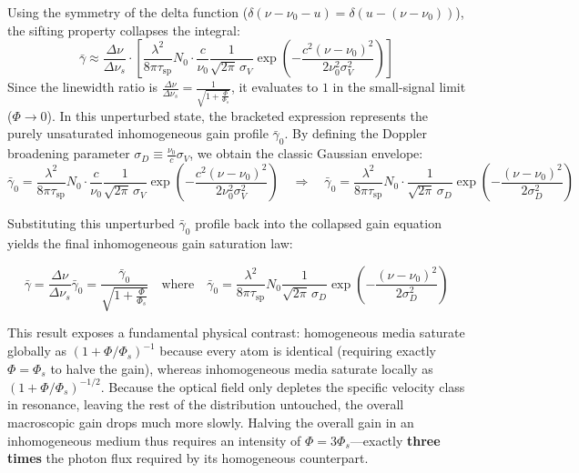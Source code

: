 Using the symmetry of the delta function ($\delta(\nu - \nu_0 - u) = \delta(u - (\nu - \nu_0))$), the sifting property collapses the integral:
\begin{equation*}
    \bar{\gamma} \approx \frac{\Delta\nu}{\Delta\nu_s} \cdot \left[ \frac{\lambda^2}{8\pi\tau_{\mathrm{sp}}} N_0 \cdot \frac{c}{\nu_0} \frac{1}{\sqrt{2\pi}\,\sigma_V} \exp\!\left(-\frac{c^2(\nu - \nu_0)^2}{2\nu_0^2\sigma_V^2}\right) \right]
\end{equation*}
Since the linewidth ratio is $\frac{\Delta\nu}{\Delta\nu_s} = \frac{1}{\sqrt{1 + \frac{\Phi}{\Phi_s}}}$, it evaluates to $1$ in the small-signal limit ($\Phi \to 0$). In this unperturbed state, the bracketed expression represents the purely unsaturated inhomogeneous gain profile $\bar{\gamma}_0$. By defining the Doppler broadening parameter $\sigma_D \equiv \frac{\nu_0}{c}\sigma_V$, we obtain the classic Gaussian envelope:
\begin{equation*}
    \bar{\gamma}_0 = \frac{\lambda^2}{8\pi\tau_{\mathrm{sp}}} N_0 \cdot \frac{c}{\nu_0} \frac{1}{\sqrt{2\pi}\,\sigma_V} \exp\!\left(-\frac{c^2(\nu - \nu_0)^2}{2\nu_0^2\sigma_V^2}\right) \quad\Rightarrow\quad \bar{\gamma}_0 = \frac{\lambda^2}{8\pi\tau_{\mathrm{sp}}} N_0 \cdot \frac{1}{\sqrt{2\pi}\,\sigma_D} \exp\!\left(-\frac{(\nu - \nu_0)^2}{2\sigma_D^2}\right)
\end{equation*}

Substituting this unperturbed $\bar{\gamma}_0$ profile back into the collapsed gain equation yields the final inhomogeneous gain saturation law:
\begin{keyresult}
    \begin{equation}
        \bar{\gamma} = \frac{\Delta\nu}{\Delta\nu_s} \bar{\gamma}_0 = \frac{\bar{\gamma}_0}{\sqrt{1 + \frac{\Phi}{\Phi_s}}} \quad \text{where} \quad \bar{\gamma}_0 = \frac{\lambda^2}{8\pi\tau_{\mathrm{sp}}} N_0 \frac{1}{\sqrt{2\pi}\,\sigma_D} \exp\!\left(-\frac{(\nu - \nu_0)^2}{2\sigma_D^2}\right)
    \end{equation}
\end{keyresult}

\begin{keyinsight}
    This result exposes a fundamental physical contrast: homogeneous media saturate globally as $(1+\Phi/\Phi_s)^{-1}$ because every atom is identical (requiring exactly $\Phi = \Phi_s$ to halve the gain), whereas inhomogeneous media saturate locally as $(1+\Phi/\Phi_s)^{-1/2}$. Because the optical field only depletes the specific velocity class in resonance, leaving the rest of the distribution untouched, the overall macroscopic gain drops much more slowly. Halving the overall gain in an inhomogeneous medium thus requires an intensity of $\Phi = 3\Phi_s$---exactly \textbf{three times} the photon flux required by its homogeneous counterpart.
\end{keyinsight}

